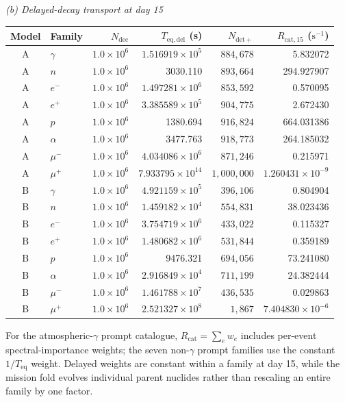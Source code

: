 \documentclass[11pt]{article}
\newcommand{\revblue}[1]{\textcolor{revisionblue}{#1}}
\begin{document}
\begin{table}[!htbp]
\vspace{0.45em}
\noindent\textit{(b) Delayed-decay transport at day 15}\par\vspace{0.20em}
\begin{tabular}{clrrrr}
\toprule
Model & Family & $N_{\mathrm{dec}}$ & $T_{\mathrm{eq,del}}$ (s)
& $N_{\mathrm{det+}}$ & $R_{\mathrm{cat},15}$ ($\mathrm{s^{-1}}$) \\
\midrule
A & $\gamma$ & $1.0\times10^6$ & $1.516919\times10^5$ & $884{,}678$ & 5.832072 \\
A & $n$ & $1.0\times10^6$ & 3030.110 & $893{,}664$ & 294.927907 \\
A & $e^-$ & $1.0\times10^6$ & $1.497281\times10^6$ & $853{,}592$ & 0.570095 \\
A & $e^+$ & $1.0\times10^6$ & $3.385589\times10^5$ & $904{,}775$ & 2.672430 \\
A & $p$ & $1.0\times10^6$ & 1380.694 & $916{,}824$ & 664.031386 \\
A & $\alpha$ & $1.0\times10^6$ & 3477.763 & $918{,}773$ & 264.185032 \\
A & $\mu^-$ & $1.0\times10^6$ & $4.034086\times10^6$ & $871{,}246$ & 0.215971 \\
A & $\mu^+$ & $1.0\times10^6$ & $7.933795\times10^{14}$ & $1{,}000{,}000$ & $1.260431\times10^{-9}$ \\
\addlinespace[0.25em]
B & $\gamma$ & $1.0\times10^6$ & $4.921159\times10^5$ & $396{,}106$ & 0.804904 \\
B & $n$ & $1.0\times10^6$ & $1.459182\times10^4$ & $554{,}831$ & 38.023436 \\
B & $e^-$ & $1.0\times10^6$ & $3.754719\times10^6$ & $433{,}022$ & 0.115327 \\
B & $e^+$ & $1.0\times10^6$ & $1.480682\times10^6$ & $531{,}844$ & 0.359189 \\
B & $p$ & $1.0\times10^6$ & 9476.321 & $694{,}056$ & 73.241080 \\
B & $\alpha$ & $1.0\times10^6$ & $2.916849\times10^4$ & $711{,}199$ & 24.382444 \\
B & $\mu^-$ & $1.0\times10^6$ & $1.461788\times10^7$ & $436{,}535$ & 0.029863 \\
B & $\mu^+$ & $1.0\times10^6$ & $2.521327\times10^8$ & $1{,}867$ & $7.404830\times10^{-6}$ \\
\bottomrule
\end{tabular}

\vspace{0.35em}
\parbox{0.97\linewidth}{\raggedright For the \revblue{atmospheric-$\gamma$ prompt
catalogue}, $R_{\mathrm{cat}}=\sum_e w_e$ includes per-event spectral-importance
weights; the seven non-$\gamma$ prompt families use the constant
$1/T_{\mathrm{eq}}$ weight. Delayed weights are constant within a family at day
15, while the mission fold evolves individual parent nuclides rather than
rescaling an entire family by one factor.}
\end{table}
\endgroup
\end{document}
